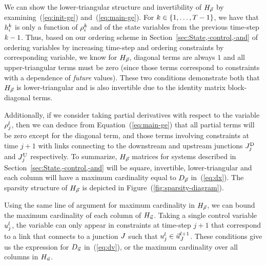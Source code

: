 We can show the lower-triangular structure and invertibility of $H_{\vec{\rho}}$
by examining~(\ref{eq:init-ge}) and~(\ref{eq:main-ge}). For $\tind\in\intrange 1{\ntime-1}$,
we have that $h_{i}^{k}$ is only a function of $\rho_{i}^{k}$
and of the state variables from the previous time-step $k-1$.
Thus, based on our ordering scheme in Section~\ref{sec:State,-control,-and}
of ordering variables by increasing time-step and ordering constraints
by corresponding variable, we know for $H_{\vec{\rho}}$, diagonal terms are
always $1$ and all upper-triangular terms must be zero (since those
terms correspond to constraints with a dependence of \emph{future}
values). These two conditions demonstrate both that $H_{\vec{\rho}}$ is lower-triangular
and is also invertible due to the identity matrix block-diagonal terms.

Additionally, if we consider taking partial derivatives with respect
to the variable $\rho_{j}^{l}$, then we can deduce from Equation~(\ref{eq:main-ge})
that all partial terms will be zero except for the diagonal term,
and those terms involving constraints at time $j+1$ with links connecting
to the downstream and upstream junctions $J_{j}^{\text{D}}$ and $J_{j}^{\text{U}}$
respectively. To summarize, $H_{\vec{\rho}}$ matrices for systems described
in Section~\ref{sec:State,-control,-and} will be square, invertible,
lower-triangular and each column will have a maximum cardinality equal
to $D_{\vec{\rho}}$ in~(\ref{eq:dx}). The sparsity structure of
$H_{\vec{\rho}}$ is depicted in Figure~(\ref{fig:sparsity-diagram}).

Using the same line of argument for maximum cardinality in $H_{\vec{\rho}}$,
we can bound the maximum cardinality of each column of $H_{\vec{u}}$. Taking
a single control variable $u_{j}^{l}$, the variable can only
appear in constraints at time-step $j+1$ that correspond to a link
that connects to a junction $J$ such that $u_{j}^{l}\in\vec{u}_{J}^{l+1}$.
These conditions give us the expression for $D_{\vec{u}}$ in~(\ref{eq:dv}),
or the maximum cardinality over all columns in $H_{\vec{u}}$.

